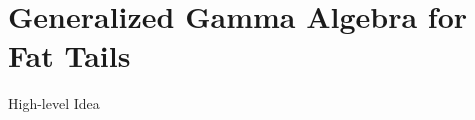 \section{Generalized Gamma Algebra for Fat Tails}

\begin{frame}{High-level Idea}
    \begin{figure}
        \centering
        \resizebox{\columnwidth}{!}{%
        
            
}
\end{figure}
\end{frame}
